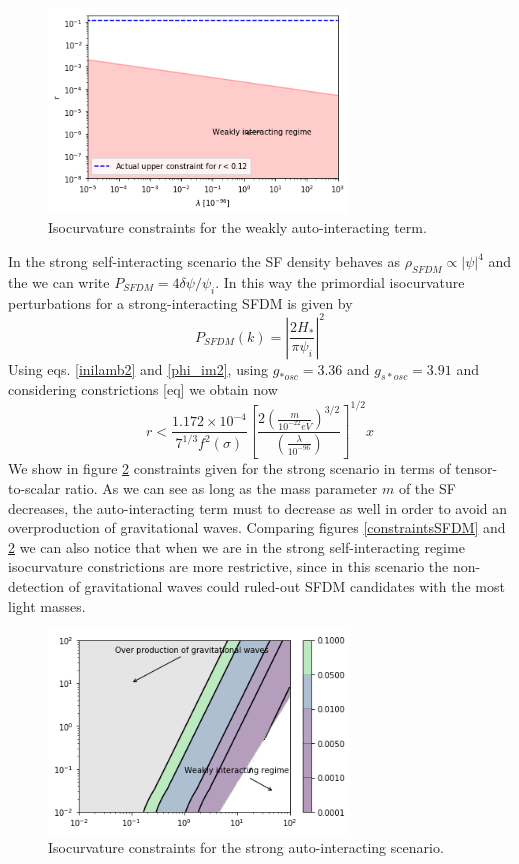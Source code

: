 \documentclass[twocolumn,           %
               showpacs,            %
               preprintnumbers,     %
               aps,                 %
               prl,          	    %
               letterpaper,             %
               superscriptaddress,      %
               nofootinbib,         %
               tightenlines,        %
               floats,floatfix      %
               ,usenatbib,
               ]{revtex4-1}
\begin{document}
\begin{figure}
\includegraphics[width=8cm]{lambdavsr.png}
\caption{Isocurvature constraints for the weakly auto-interacting term.}\label{constraintsSFDMl}
\end{figure} 

In the strong self-interacting scenario the SF density behaves as $\rho_{SFDM}\propto |\psi|^4$ and the we can write $P_{SFDM}=4\delta\psi/\psi_i$. In this way the primordial isocurvature perturbations for a strong-interacting SFDM is given by
\begin{equation}
P_{SFDM}(k)=\left|\frac{2H_*}{\pi\psi_i}\right|^2
\end{equation}
Using eqs. \eqref{inilamb2} and \eqref{phi_im2}, using $g_{*osc}=3.36$ and $g_{s*osc}=3.91$  and considering constrictions [eq] we obtain now
\begin{equation}
r<\frac{1.172\times 10^{-4}}{7^{1/3}f^2(\sigma)}\left[\frac{2\left(\frac{m}{10^{-22}eV}\right)^{3/2}}{\left(\frac{\lambda}{10^{-96}}\right)}\right]^{1/2}
x\end{equation}
We show in figure \ref{constraintsSFDMls} constraints given for the strong scenario in terms of tensor-to-scalar ratio. As we can see as long as the mass parameter $m$ of the SF decreases, the auto-interacting term must to decrease as well in order to avoid an overproduction of gravitational waves. Comparing figures \ref{constraintsSFDM} and \ref{constraintsSFDMls} we can also notice that when we are in the strong self-interacting regime isocurvature constrictions are more restrictive, since in this scenario the non-detection of gravitational waves could ruled-out SFDM candidates with the most light masses.
\begin{figure}
\includegraphics[width=8cm]{stronglamb.png}
\caption{Isocurvature constraints for the strong auto-interacting scenario.}\label{constraintsSFDMls}
\end{figure} 
\end{document}
